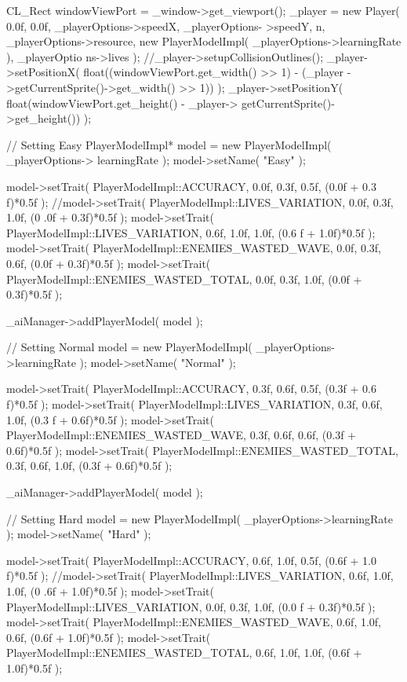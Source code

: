 \begin{DoxyCode}
{       
        CL_Rect windowViewPort = _window->get_viewport();
        _player = new Player( 0.0f, 0.0f, _playerOptions->speedX, _playerOptions-
      >speedY, n, _playerOptions->resource,
                new PlayerModelImpl( _playerOptions->learningRate ), _playerOptio
      ns->lives );
        //_player->setupCollisionOutlines();
        _player->setPositionX( float((windowViewPort.get_width() >> 1) - (_player
      ->getCurrentSprite()->get_width() >> 1)) );
        _player->setPositionY( float(windowViewPort.get_height() - _player->
      getCurrentSprite()->get_height()) );

        // Setting Easy
        PlayerModelImpl* model = new PlayerModelImpl( _playerOptions->
      learningRate );
        model->setName( "Easy" );

        model->setTrait( PlayerModelImpl::ACCURACY, 0.0f, 0.3f, 0.5f, (0.0f + 0.3
      f)*0.5f );
        //model->setTrait( PlayerModelImpl::LIVES_VARIATION, 0.0f, 0.3f, 1.0f, (0
      .0f + 0.3f)*0.5f );
        model->setTrait( PlayerModelImpl::LIVES_VARIATION, 0.6f, 1.0f, 1.0f, (0.6
      f + 1.0f)*0.5f );
        model->setTrait( PlayerModelImpl::ENEMIES_WASTED_WAVE, 0.0f, 0.3f, 0.6f, 
      (0.0f + 0.3f)*0.5f );
        model->setTrait( PlayerModelImpl::ENEMIES_WASTED_TOTAL, 0.0f, 0.3f, 1.0f,
       (0.0f + 0.3f)*0.5f );

        _aiManager->addPlayerModel( model );

        // Setting Normal
        model = new PlayerModelImpl( _playerOptions->learningRate );
        model->setName( "Normal" );

        model->setTrait( PlayerModelImpl::ACCURACY, 0.3f, 0.6f, 0.5f, (0.3f + 0.6
      f)*0.5f );
        model->setTrait( PlayerModelImpl::LIVES_VARIATION, 0.3f, 0.6f, 1.0f, (0.3
      f + 0.6f)*0.5f );
        model->setTrait( PlayerModelImpl::ENEMIES_WASTED_WAVE, 0.3f, 0.6f, 0.6f, 
      (0.3f + 0.6f)*0.5f );
        model->setTrait( PlayerModelImpl::ENEMIES_WASTED_TOTAL, 0.3f, 0.6f, 1.0f,
       (0.3f + 0.6f)*0.5f );

        _aiManager->addPlayerModel( model );

        // Setting Hard
        model = new PlayerModelImpl( _playerOptions->learningRate );
        model->setName( "Hard" );

        model->setTrait( PlayerModelImpl::ACCURACY, 0.6f, 1.0f, 0.5f, (0.6f + 1.0
      f)*0.5f );
        //model->setTrait( PlayerModelImpl::LIVES_VARIATION, 0.6f, 1.0f, 1.0f, (0
      .6f + 1.0f)*0.5f );
        model->setTrait( PlayerModelImpl::LIVES_VARIATION, 0.0f, 0.3f, 1.0f, (0.0
      f + 0.3f)*0.5f );
        model->setTrait( PlayerModelImpl::ENEMIES_WASTED_WAVE, 0.6f, 1.0f, 0.6f, 
      (0.6f + 1.0f)*0.5f );
        model->setTrait( PlayerModelImpl::ENEMIES_WASTED_TOTAL, 0.6f, 1.0f, 1.0f,
       (0.6f + 1.0f)*0.5f );

}
\end{DoxyCode}
